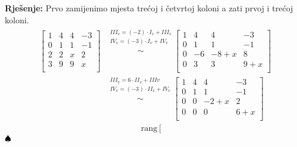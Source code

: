 \documentclass{article}
\newenvironment{solution}{\noindent\textbf{Rje\v senje:\newline}}{$\hfill\spadesuit$}
\begin{document}
\begin{solution}
    Prvo zamijenimo mjesta tre\' coj i \v cetvrtoj koloni a zati prvoj i tre\' coj koloni.
    \begin{equation}
        \label{eq:4}
        \begin{aligned}
            \left[
        \begin{array}{cccc}
            1 & 4 & 4 & -3 \\
            0 & 1 & 1 & -1 \\
            2 & 2 & x & 2 \\
            3 & 9 & 9 & x \\
        \end{array}
        \right] &\overset{\begin{array}{c}
            III_v=(-2)\cdot I_v+III_v \\
            IV_v=(-3)\cdot I_v+IV_v \\
        \end{array}}{\sim}\left[
            \begin{array}{cccc}
                1 & 4 & 4 & -3 \\
                0 & 1 & 1 & -1 \\
                0 & -6 & -8+x & 8 \\
                0 & 3 & 3 & 9+x \\
            \end{array}
        \right]\\
        &\overset{\begin{array}{c}
            III_v=6\cdot II_v+IIIv \\
            IV_v=(-3)\cdot II_v+IV_v \\
        \end{array}}{\sim}\left[
            \begin{array}{cccc}
                1 & 4 & 4 & -3 \\
                0 & 1 & 1 & -1 \\
                0 & 0 & -2+x & 2 \\
                0 & 0 & 0 & 6+x \\
            \end{array}
        \right]
        \end{aligned}
    \end{equation}
    \begin{equation*}
        \begin{aligned}
            \text{rang}\left[
            \begin{array}{cccc}

\end{array}
\end{aligned}
\end{equation*}
\end{solution}
\end{document}
